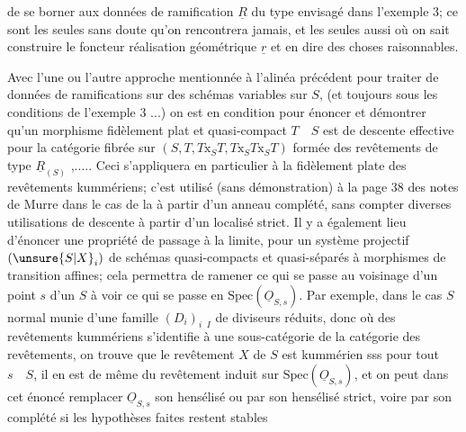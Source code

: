 de se borner aux données de ramification $\underline R$ du type envisagé dans l'exemple 3; ce sont les seules sans doute qu'on rencontrera jamais, et les seules aussi où on sait construire le foncteur réalisation géométrique $\underline r$ et en dire des choses raisonnables.

Avec l'une ou l'autre approche mentionnée à l'alinéa précédent pour traiter de données de ramifications sur des schémas variables sur $S$, (et toujours sous les conditions de l'exemple 3 ...) on est en condition pour énoncer et démontrer qu'un morphisme fidèlement plat et quasi-compact $T\quad S$ est de descente effective pour la catégorie fibrée sur $(S,T,T\mathbin{\mathrm{x}}_S T,T\mathbin{\mathrm{x}}_S T\mathbin{\mathrm{x}}_S T)$ formée des revêtements de type $\underline R_{(S)}$ ,..... Ceci s'appliquera en particulier à la  fidèlement plate des revêtements kummériens; c'est utilisé (sans démonstration) à la page 38 des notes de Murre dans le cas de la  à partir d'un anneau complété, sans compter diverses utilisations de descente à partir d'un localisé strict. Il y a également lieu d'énoncer une propriété de passage à la limite, pour un système projectif $(\unsure{S|X}_i)$ de schémas quasi-compacts et quasi-séparés à morphismes de transition affines; cela permettra de ramener ce qui se passe au voisinage d'un point $s$ d'un $S$ à voir ce qui se passe en $\mathrm{Spec}(\underline O_{S,s})$. Par exemple, dans le cas $S$  normal munie d'une famille $(D_i)_{i\;\;I}$ de diviseurs réduits, donc où  des revêtements kummériens s'identifie à  une sous-catégorie de la catégorie des revêtements, on trouve que le revêtement $X$ de $S$ est  kummérien sss pour tout $s\quad S$, il en est de même du revêtement induit sur $\mathrm{Spec}(\underline O_{S,s})$, et on peut dans cet énoncé remplacer $\underline O_{S,s}$ son hensélisé ou par son hensélisé strict,  voire par son complété si les hypothèses faites restent stables
